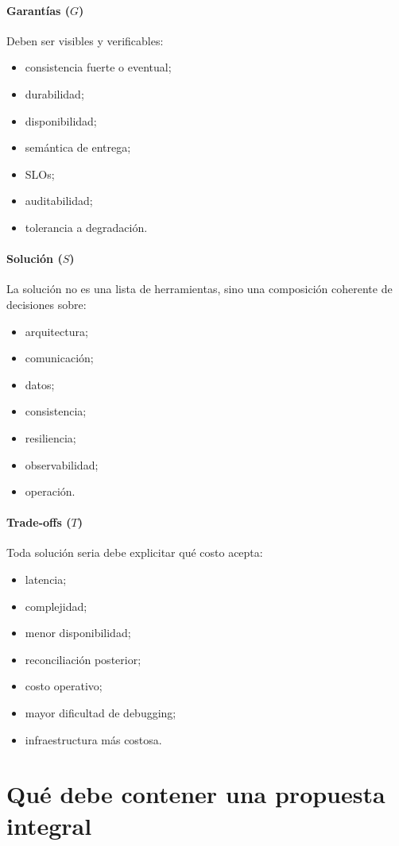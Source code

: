 \documentclass[variant=apuntes,cover=institutional,mode=screen]{ua-engineering-v6-article}
\begin{document}
\paragraph{Garantías ($G$)}
Deben ser visibles y verificables:
\begin{itemize}
\item consistencia fuerte o eventual;
\item durabilidad;
\item disponibilidad;
\item semántica de entrega;
\item SLOs;
\item auditabilidad;
\item tolerancia a degradación.
\end{itemize}

\paragraph{Solución ($S$)}
La solución no es una lista de herramientas, sino una composición coherente de decisiones sobre:
\begin{itemize}
\item arquitectura;
\item comunicación;
\item datos;
\item consistencia;
\item resiliencia;
\item observabilidad;
\item operación.
\end{itemize}

\paragraph{Trade-offs ($T$)}
Toda solución seria debe explicitar qué costo acepta:
\begin{itemize}
\item latencia;
\item complejidad;
\item menor disponibilidad;
\item reconciliación posterior;
\item costo operativo;
\item mayor dificultad de debugging;
\item infraestructura más costosa.
\end{itemize}

\section{Qué debe contener una propuesta integral}
\end{document}

